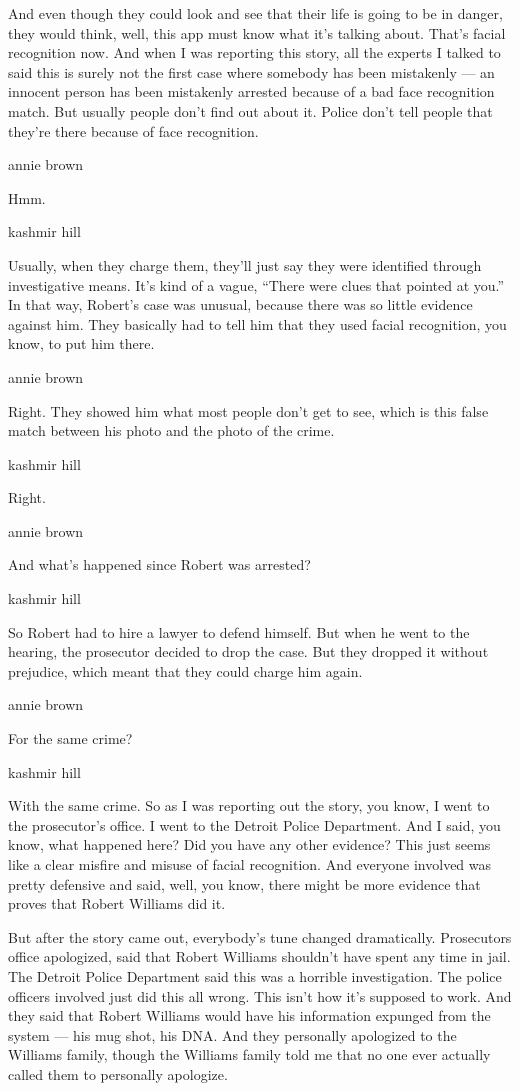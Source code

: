 And even though they could look and see that their life is going to be
in danger, they would think, well, this app must know what it's talking
about. That's facial recognition now. And when I was reporting this
story, all the experts I talked to said this is surely not the first
case where somebody has been mistakenly --- an innocent person has been
mistakenly arrested because of a bad face recognition match. But usually
people don't find out about it. Police don't tell people that they're
there because of face recognition.

annie brown

Hmm.

kashmir hill

Usually, when they charge them, they'll just say they were identified
through investigative means. It's kind of a vague, ``There were clues
that pointed at you.'' In that way, Robert's case was unusual, because
there was so little evidence against him. They basically had to tell him
that they used facial recognition, you know, to put him there.

annie brown

Right. They showed him what most people don't get to see, which is this
false match between his photo and the photo of the crime.

kashmir hill

Right.

annie brown

And what's happened since Robert was arrested?

kashmir hill

So Robert had to hire a lawyer to defend himself. But when he went to
the hearing, the prosecutor decided to drop the case. But they dropped
it without prejudice, which meant that they could charge him again.

annie brown

For the same crime?

kashmir hill

With the same crime. So as I was reporting out the story, you know, I
went to the prosecutor's office. I went to the Detroit Police
Department. And I said, you know, what happened here? Did you have any
other evidence? This just seems like a clear misfire and misuse of
facial recognition. And everyone involved was pretty defensive and said,
well, you know, there might be more evidence that proves that Robert
Williams did it.

But after the story came out, everybody's tune changed dramatically.
Prosecutors office apologized, said that Robert Williams shouldn't have
spent any time in jail. The Detroit Police Department said this was a
horrible investigation. The police officers involved just did this all
wrong. This isn't how it's supposed to work. And they said that Robert
Williams would have his information expunged from the system --- his mug
shot, his DNA. And they personally apologized to the Williams family,
though the Williams family told me that no one ever actually called them
to personally apologize.

